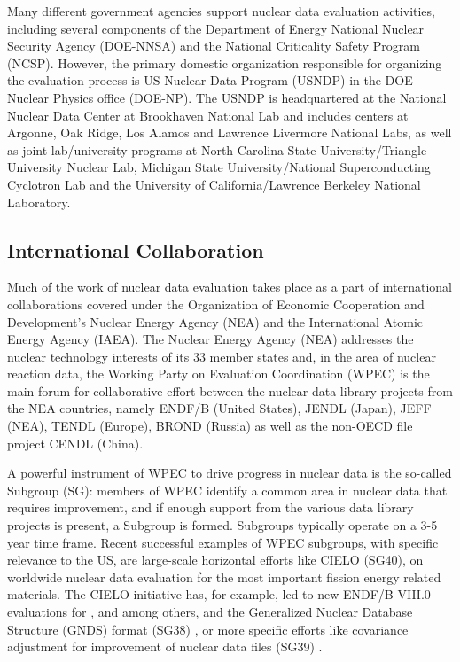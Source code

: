 \documentclass[letterpaper]{ar-1col}
\begin{document}
Many different government agencies support nuclear data evaluation activities, including several components of the Department of Energy National Nuclear Security Agency (DOE-NNSA) and the National Criticality Safety Program (NCSP).
 However, the primary domestic organization responsible for organizing the evaluation process is US Nuclear Data Program (USNDP) in the DOE Nuclear Physics office (DOE-NP).
 The USNDP is headquartered at the National Nuclear Data Center at Brookhaven National Lab and includes centers at Argonne, Oak Ridge, Los Alamos and Lawrence Livermore National Labs, as well as joint lab/university programs at North Carolina State University/Triangle University Nuclear Lab, Michigan State University/National Superconducting Cyclotron Lab and the University of California/Lawrence Berkeley National Laboratory.
  


\subsection{International Collaboration}

Much of the work of nuclear data evaluation takes place as a part of international collaborations covered under the Organization of Economic Cooperation and Development's Nuclear Energy Agency (NEA) and the International Atomic Energy Agency (IAEA).
 The Nuclear Energy Agency (NEA) addresses the nuclear technology interests of its 33 member states and, in the area of nuclear reaction data, the Working Party on Evaluation Coordination (WPEC) is the main forum for collaborative effort between the nuclear data library projects from the NEA countries, namely ENDF/B (United States), JENDL (Japan), JEFF (NEA), TENDL (Europe), BROND (Russia) as well as the non-OECD file project CENDL (China).

A powerful instrument of WPEC to drive progress in nuclear data is the so-called Subgroup (SG): members of WPEC identify a common area in nuclear data that requires improvement, and if enough support from the various data library projects is present, a Subgroup is formed.
 Subgroups typically operate on a 3-5 year time frame.
Recent successful examples of WPEC subgroups, with specific relevance to the US, are large-scale horizontal efforts like CIELO (SG40), on worldwide nuclear data evaluation for the most important fission energy related materials.
The CIELO initiative has, for example, led to new ENDF/B-VIII.0 evaluations for ,  and  among others, and the Generalized Nuclear Database Structure (GNDS) format (SG38) \cite{SG38}, or more specific efforts like covariance adjustment for improvement of nuclear data files (SG39) \cite{SG39}.
\end{document}
